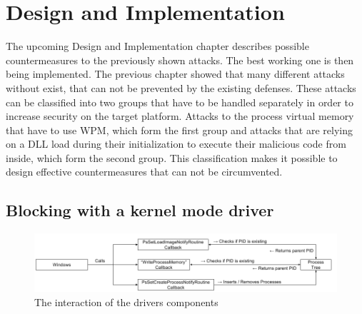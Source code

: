 \section{Design and Implementation}
The upcoming Design and Implementation chapter describes possible countermeasures to the previously shown attacks. The best working one is then being implemented.
\label{sec:implementation}
The previous chapter showed that many different attacks without exist, that can not be prevented by the existing defenses. These attacks can be classified into two groups that have to be handled separately in order to increase security on the target platform. Attacks to the process virtual memory that have to use \gls{WPM}, which form the first group and attacks that are relying on a \gls{DLL} load during their initialization to execute their malicious code from inside, which form the second group. This classification makes it possible to design effective countermeasures that can not be circumvented. 

\subsection{Blocking  with a kernel mode driver}
\begin{figure}[!htbp]
\centering
\includegraphics[angle=90,scale=0.6]{sections/implementation/interaction.png}
\caption{The interaction of the drivers components}
\label{fig:interaction}
\end{figure}

